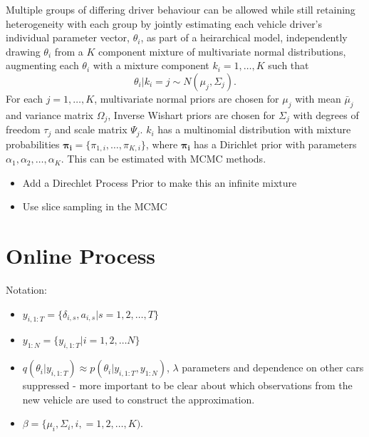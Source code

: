\documentclass[12pt,a4paper]{article}\usepackage[]{graphicx}\usepackage[]{color}
\begin{document}
Multiple groups of differing driver behaviour can be allowed while still retaining heterogeneity with each group by jointly estimating each vehicle driver's individual parameter vector, $\theta_i$, as part of a heirarchical model, independently drawing $\theta_i$ from a $K$ component mixture of multivariate normal distributions, augmenting each $\theta_i$ with a mixture component $k_i = 1, \dots, K$ such that 
\begin{equation}
\theta_i | k_i = j \sim N(\mu_j, \Sigma_j).
\end{equation}
For each $j = 1, \dots, K$, multivariate normal priors are chosen for $\mu_j$ with mean $\bar{\mu}_j$ and variance matrix $\Omega_j$, Inverse Wishart priors are chosen for $\Sigma_j$ with degrees of freedom $\tau_j$ and scale matrix $\Psi_j$. $k_{i}$ has a multinomial distribution with mixture probabilities $\boldsymbol{\pi_i} = \{\pi_{1, i}, \dots, \pi_{K, i}\}$, where $\boldsymbol{\pi_i}$ has a Dirichlet prior with parameters $\alpha_1, \alpha_2, \dots, \alpha_K$. This can be estimated with MCMC methods.


\begin{itemize}
\item Add a Direchlet Process Prior to make this an infinite mixture
\item Use slice sampling in the MCMC
\end{itemize}

\section{Online Process}

Notation:
\begin{itemize}
\item $y_{i, 1:T} = \{\delta_{i, s}, a_{i, s} | s = 1, 2, \dots, T\}$ 
\item $y_{1:N} = \{y_{i, 1:T} | i = 1, 2, \dots N\}$
\item $q(\theta_i | y_{i, 1:T}) \approx p(\theta_i | y_{i, 1:T}, y_{1:N})$, $\lambda$ parameters and dependence on other cars suppressed - more important to be clear about which observations from the new vehicle are used to construct the approximation.
\item $\beta = \{\mu_i, \Sigma_i, i, = 1, 2, \dots, K)$.
\end{itemize}
\end{document}
